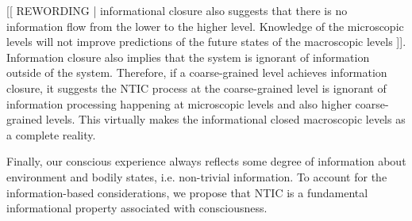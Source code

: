 \documentclass[utf8]{article}
\newcommand{\rewording}[1]{\textcolor{RawSienna}{[[ REWORDING | #1 ]]}}
\begin{document}
        
        \rewording{informational closure also suggests that there is no information flow from the lower to the higher level. Knowledge of the microscopic levels will not improve predictions of the future states of the macroscopic levels \citep{PFANTE.2014}}. 
        Information closure also implies that the system is ignorant of information outside of the system. Therefore, if a coarse-grained level achieves information closure, it suggests the NTIC process at the coarse-grained level is ignorant of information processing happening at microscopic levels and also higher coarse-grained levels. This virtually makes the informational closed macroscopic levels as a complete reality. 
        
        Finally, our conscious experience always reflects some degree of information about environment and bodily states, i.e. non-trivial information. To account for the information-based considerations, we propose that NTIC is a fundamental informational property associated with consciousness. 
        
        
        
\end{document}
